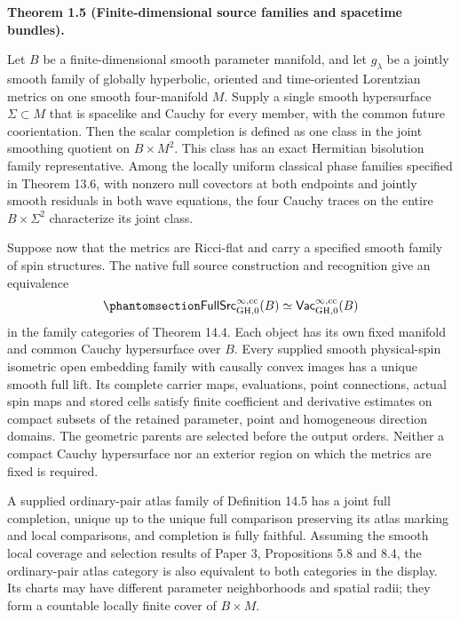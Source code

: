 \documentclass[
  english,
  11pt,
  reqno]{amsart}
\makeatletter
\newcommand{\pandocstatementheading}[1]{%
  \par\addpenalty{\@beginparpenalty}%
  \addvspace{.5\baselineskip plus .2\baselineskip minus .2\baselineskip}%
  {\normalfont\bfseries #1\par}%
  \nobreak\@afterindenttrue\@afterheading
}
\makeatother
\begin{document}
\pandocstatementheading{\protect{}\label{thm:global-family-correspondence-overview}Theorem 1.5 (Finite-dimensional source families and spacetime bundles).}

Let \(B\) be a finite-dimensional smooth parameter manifold, and let
\(g_\lambda\) be a jointly smooth family of globally hyperbolic,
oriented and time-oriented Lorentzian metrics on one smooth
four-manifold \(M\). Supply a single smooth hypersurface
\(\Sigma\subset M\) that is spacelike and Cauchy for every member, with
the common future coorientation. Then the scalar completion is defined
as one class in the joint smoothing quotient on \(B\times M^2\). This
class has an exact Hermitian bisolution family representative. Among the
locally uniform classical phase families specified in Theorem 13.6, with
nonzero null covectors at both endpoints and jointly smooth residuals in
both wave equations, the four Cauchy traces on the entire
\(B\times\Sigma^2\) characterize its joint class.

Suppose now that the metrics are Ricci-flat and carry a specified smooth
family of spin structures. The native full source construction and
recognition give an equivalence
\begin{equation}\protect\phantomsection\label{eq:global-family-correspondence-overview}{
\mathsf{FullSrc}^{\infty,\mathrm{cc}}_{\mathrm{GH},0}(B)
\simeq
\mathsf{Vac}^{\infty,\mathrm{cc}}_{\mathrm{GH},0}(B)
}\end{equation} in the family categories of Theorem 14.4. Each object
has its own fixed manifold and common Cauchy hypersurface over \(B\).
Every supplied smooth physical-spin isometric open embedding family with
causally convex images has a unique smooth full lift. Its complete
carrier maps, evaluations, point connections, actual spin maps and
stored cells satisfy finite coefficient and derivative estimates on
compact subsets of the retained parameter, point and homogeneous
direction domains. The geometric parents are selected before the output
orders. Neither a compact Cauchy hypersurface nor an exterior region on
which the metrics are fixed is required.

A supplied ordinary-pair atlas family of Definition 14.5 has a joint
full completion, unique up to the unique full comparison preserving its
atlas marking and local comparisons, and completion is fully faithful.
Assuming the smooth local coverage and selection results of Paper 3,
Propositions 5.8 and 8.4, the ordinary-pair atlas category is also
equivalent to both categories in the display. Its charts may have
different parameter neighborhoods and spatial radii; they form a
countable locally finite cover of \(B\times M\).
\end{document}
